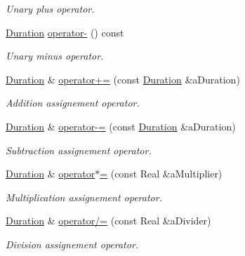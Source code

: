 \begin{DoxyCompactItemize}
\begin{DoxyCompactList}\small\item\em Unary plus operator. \end{DoxyCompactList}\item 
\hyperlink{classostk_1_1physics_1_1time_1_1_duration}{Duration} \hyperlink{classostk_1_1physics_1_1time_1_1_duration_ad6311a658bac277c9739cf938106a274}{operator-\/} () const
\begin{DoxyCompactList}\small\item\em Unary minus operator. \end{DoxyCompactList}\item 
\hyperlink{classostk_1_1physics_1_1time_1_1_duration}{Duration} \& \hyperlink{classostk_1_1physics_1_1time_1_1_duration_af0bd86fc4ec2d7a59219b3c72f699892}{operator+=} (const \hyperlink{classostk_1_1physics_1_1time_1_1_duration}{Duration} \&a\+Duration)
\begin{DoxyCompactList}\small\item\em Addition assignement operator. \end{DoxyCompactList}\item 
\hyperlink{classostk_1_1physics_1_1time_1_1_duration}{Duration} \& \hyperlink{classostk_1_1physics_1_1time_1_1_duration_a81655d5bcb4ed4b13d2858a4c01917bd}{operator-\/=} (const \hyperlink{classostk_1_1physics_1_1time_1_1_duration}{Duration} \&a\+Duration)
\begin{DoxyCompactList}\small\item\em Subtraction assignement operator. \end{DoxyCompactList}\item 
\hyperlink{classostk_1_1physics_1_1time_1_1_duration}{Duration} \& \hyperlink{classostk_1_1physics_1_1time_1_1_duration_ae26dc624227d7c6d8cb4a7436c34a4ae}{operator$\ast$=} (const Real \&a\+Multiplier)
\begin{DoxyCompactList}\small\item\em Multiplication assignement operator. \end{DoxyCompactList}\item 
\hyperlink{classostk_1_1physics_1_1time_1_1_duration}{Duration} \& \hyperlink{classostk_1_1physics_1_1time_1_1_duration_ac1e48e49d1dfeb3890a6944f13c513b7}{operator/=} (const Real \&a\+Divider)
\begin{DoxyCompactList}\small\item\em Division assignement operator. \end{DoxyCompactList}\item 

\end{DoxyCompactItemize}

